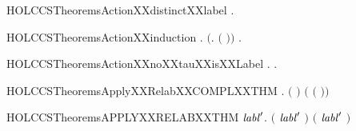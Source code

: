 \newcommand{\HOLCCSTheoremsActionXXdistinct}{\UseVerbatim{HOLCCSTheoremsActionXXdistinct}}
\begin{SaveVerbatim}{HOLCCSTheoremsActionXXdistinctXXlabel}
\HOLTokenTurnstile{} \HOLSymConst{\HOLTokenForall{}}.   \HOLSymConst{\HOLTokenNotEqual{}} \HOLConst{\ensuremath{\tau}}
\end{SaveVerbatim}
\newcommand{\HOLCCSTheoremsActionXXdistinctXXlabel}{\UseVerbatim{HOLCCSTheoremsActionXXdistinctXXlabel}}
\begin{SaveVerbatim}{HOLCCSTheoremsActionXXinduction}
\HOLTokenTurnstile{} \HOLSymConst{\HOLTokenForall{}}.  \HOLConst{\ensuremath{\tau}} \HOLSymConst{\HOLTokenConj{}} \ensuremath{(}\HOLSymConst{\HOLTokenForall{}}.  \ensuremath{(} \ensuremath{)}\ensuremath{)} \HOLSymConst{\HOLTokenImp{}} \HOLSymConst{\HOLTokenForall{}}.  
\end{SaveVerbatim}
\newcommand{\HOLCCSTheoremsActionXXinduction}{\UseVerbatim{HOLCCSTheoremsActionXXinduction}}
\begin{SaveVerbatim}{HOLCCSTheoremsActionXXnoXXtauXXisXXLabel}
\HOLTokenTurnstile{} \HOLSymConst{\HOLTokenForall{}}.  \HOLSymConst{\HOLTokenNotEqual{}} \HOLConst{\ensuremath{\tau}} \HOLSymConst{\HOLTokenImp{}} \HOLSymConst{\HOLTokenExists{}}.  \HOLSymConst{\ensuremath{=}}  
\end{SaveVerbatim}
\newcommand{\HOLCCSTheoremsActionXXnoXXtauXXisXXLabel}{\UseVerbatim{HOLCCSTheoremsActionXXnoXXtauXXisXXLabel}}
\begin{SaveVerbatim}{HOLCCSTheoremsApplyXXRelabXXCOMPLXXTHM}
\HOLTokenTurnstile{} \HOLSymConst{\HOLTokenForall{}} .
         \ensuremath{(} \ensuremath{)} \HOLSymConst{\ensuremath{=}}
        \ensuremath{(}  \ensuremath{(} \ensuremath{)}\ensuremath{)}
\end{SaveVerbatim}
\newcommand{\HOLCCSTheoremsApplyXXRelabXXCOMPLXXTHM}{\UseVerbatim{HOLCCSTheoremsApplyXXRelabXXCOMPLXXTHM}}
\begin{SaveVerbatim}{HOLCCSTheoremsAPPLYXXRELABXXTHM}
\HOLTokenTurnstile{} \HOLSymConst{\HOLTokenForall{}} \ensuremath{\HOLBoundVar{labl}\sp{\prime}}.
       \ensuremath{(} \ensuremath{\HOLBoundVar{labl}\sp{\prime}} \HOLSymConst{\ensuremath{=}}  \ensuremath{)} \HOLSymConst{\HOLTokenEquiv{}}
       \ensuremath{(} \ensuremath{\HOLBoundVar{labl}\sp{\prime}} \HOLSymConst{\ensuremath{=}}  \ensuremath{)}
\end{SaveVerbatim}
